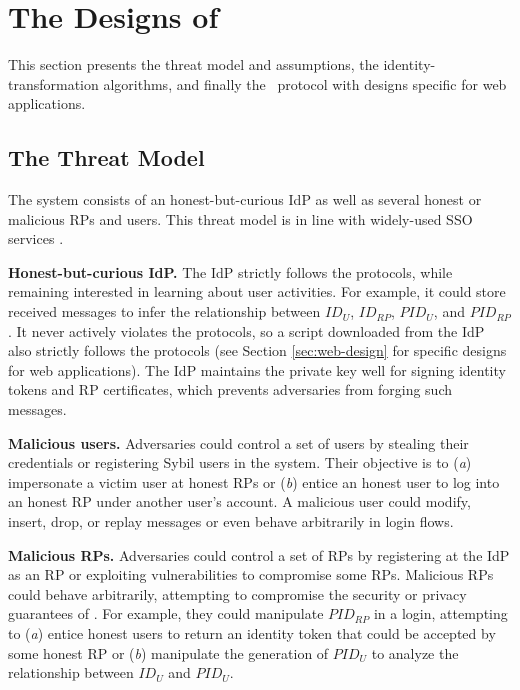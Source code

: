 \section{The Designs of \usso}
\label{sec:UPPRESSO}

This section presents the threat model and assumptions, the identity-transformation algorithms, and finally the \usso\ protocol with designs specific for web applications.

\subsection{The Threat Model}
\label{subsec:threatmodel}
The system consists of an honest-but-curious IdP as well as several honest or malicious RPs and users. %
This threat model is in line with widely-used SSO services \cite{OpenIDConnect,rfc6749, SAML, SAMLIdentifier}.

\noindent \textbf{Honest-but-curious IdP.} The IdP strictly follows the protocols,
 while remaining interested in learning about user activities.
For example, it could store received messages to infer the relationship between $ID_U$, $ID_{RP}$, $PID_{U}$, and $PID_{RP}$.
It never actively violates the protocols, so a script downloaded from the IdP also strictly follows the protocols (see Section \ref{sec:web-design} for specific designs for web applications).
The IdP maintains the private key well for signing identity tokens and RP certificates, %
which prevents adversaries from forging such messages.

\noindent \textbf{Malicious users.} Adversaries could control a set of users by stealing their credentials or registering Sybil users in the system.
 Their objective \cite{SPRESSO, FettKS14} is to (\emph{a}) impersonate a victim user at honest RPs or (\emph{b}) entice an honest user to log into an honest RP under another user's account.
A malicious user could modify, insert, drop, or replay messages or even behave arbitrarily in login flows.

\noindent \textbf{Malicious RPs.}
Adversaries could control a set of RPs by registering at the IdP as an RP or exploiting vulnerabilities to compromise some RPs.
Malicious RPs could behave arbitrarily, attempting to compromise the security or privacy guarantees of \usso.
For example, they could manipulate $PID_{RP}$ in a login, attempting to (\emph{a}) entice honest users to return an identity token that could be accepted by some honest RP or (\emph{b}) manipulate the generation of $PID_U$ to analyze the relationship between $ID_U$ and $PID_U$.


